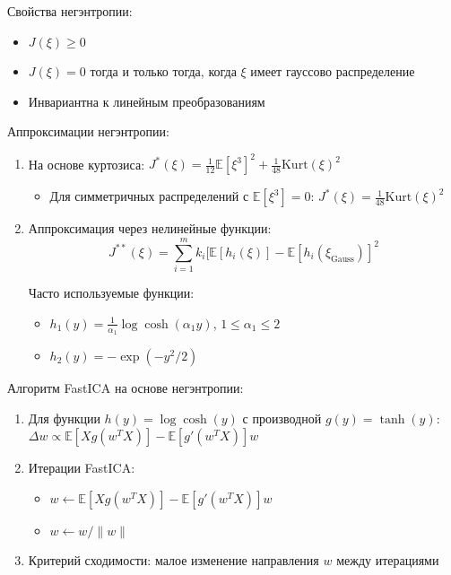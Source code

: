 \documentclass[a4paper,12pt]{article}
\begin{document}
Свойства негэнтропии:
\begin{itemize}
    \item $J(\xi) \geq 0$
    \item $J(\xi) = 0$ тогда и только тогда, когда $\xi$ имеет гауссово распределение
    \item Инвариантна к линейным преобразованиям
\end{itemize}

Аппроксимации негэнтропии:
\begin{enumerate}
    \item На основе куртозиса: $J^*(\xi) = \frac{1}{12} \mathbb{E}[\xi^3]^2 + \frac{1}{48} \text{Kurt}(\xi)^2$
    \begin{itemize}
        \item Для симметричных распределений с $\mathbb{E}[\xi^3] = 0$: $J^*(\xi) = \frac{1}{48} \text{Kurt}(\xi)^2$
    \end{itemize}

    \item Аппроксимация через нелинейные функции:
    $$J^{**}(\xi) = \sum_{i=1}^m k_i[\mathbb{E}[h_i(\xi)] - \mathbb{E}[h_i(\xi_{\text{Gauss}})]^2$$
    
    Часто используемые функции:
    \begin{itemize}
        \item $h_1(y) = \frac{1}{\alpha_1} \log \cosh(\alpha_1 y)$, $1 \leq \alpha_1 \leq 2$
        \item $h_2(y) = -\exp(-y^2/2)$
    \end{itemize}
\end{enumerate}

Алгоритм FastICA на основе негэнтропии:
\begin{enumerate}
    \item Для функции $h(y) = \log \cosh(y)$ с производной $g(y) = \tanh(y)$:
    $\Delta w \propto \mathbb{E}[X g(w^T X)] - \mathbb{E}[g'(w^T X)]w$

    \item Итерации FastICA:
    \begin{itemize}
        \item $w \leftarrow \mathbb{E}[X g(w^T X)] - \mathbb{E}[g'(w^T X)]w$
        \item $w \leftarrow w/\|w\|$
    \end{itemize}

    \item Критерий сходимости: малое изменение направления $w$ между итерациями
\end{enumerate}
\end{document}
